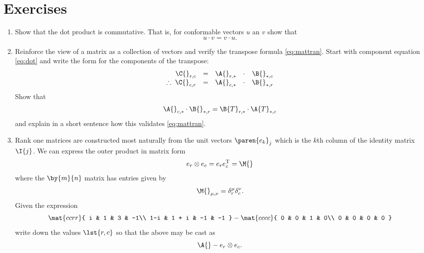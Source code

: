 \section{Exercises}
\begin{enumerate}
\item Show that the dot product is commutative. That is, for conformable vectors $u$ an $v$ show that
\begin{equation}
  u\cdot v=v \cdot u.
\end{equation}
\item Reinforce the view of a matrix as a collection of vectors and verify the transpose formula \eqref{eq:mattran}. Start with component equation \eqref{eq:dot} and write the form for the components of the transpose:
\begin{equation}
  \begin{array}{rcccc}
    \C{}_{r,c} &=& \A{}_{r,*}&\cdot&\B{}_{*,c} \\
    \therefore\ \C{}_{c,r} &=& \A{}_{c,*}&\cdot&\B{}_{*,r} \\
  \end{array}
\end{equation}
Show that
\begin{equation}
  \A{}_{c,*}\cdot\B{}_{*,r} = \B{T}_{r,*}\cdot\A{T}_{*,c}
\end{equation}
and explain in a short sentence how this validates \eqref{eq:mattran}.
\item Rank one matrices are constructed most naturally from the unit vectors $\paren{e_{k}}_{j}$ which is the $k$th column of the identity matrix $\I{j}$. We can express the outer product in matrix form
\begin{equation}
  e_{r}\otimes e_{c} = e_{r}e_{c}^{\mathrm{T}} = \M{}
\end{equation}
where the $\by{m}{n}$ matrix has entries given by
\begin{equation}
  \M{}_{\mu,\nu} = \delta_{r}^{\mu}\delta_{c}^{\nu}.
\end{equation}
\subitem Given the expression
\begin{equation}
  \mat{ccrr}
  {
  i & 1 & 3 & -1\\
  1-i & 1 + i & -1 & -1
  }
  -
  \mat{cccc}
  {
  0 & 0 & 1 & 0\\
  0 & 0 & 0 & 0
  }
\end{equation}
write down the values $\lst{r,c}$ so that the above may be cast as
\begin{equation}
  \A{} - e_{r}\otimes e_{c}.
\end{equation}

\end{enumerate}

